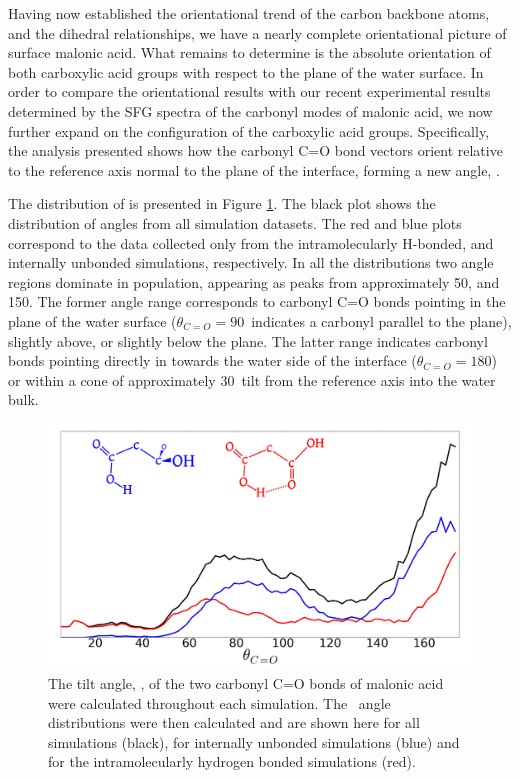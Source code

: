 Having now established the \thetaphi orientational trend of the carbon backbone atoms, and the \psipsi dihedral relationships, we have a nearly complete orientational picture of surface malonic acid. What remains to determine is the absolute orientation of both carboxylic acid groups with respect to the plane of the water surface. In order to compare the orientational results with our recent experimental results determined by the SFG spectra of the carbonyl modes of malonic acid,\cite{Blower2012} we now further expand on the configuration of the carboxylic acid groups. Specifically, the analysis presented shows how the carbonyl C=O bond vectors orient relative to the reference axis normal to the plane of the interface, forming a new angle, \thetacarb.

The distribution of \thetacarb is presented in Figure \ref{fig:theta-carb}. The black plot shows the distribution of angles from all simulation datasets. The red and blue plots correspond to the \thetacarb data collected only from the intramolecularly H-bonded, and internally unbonded simulations, respectively. In all the distributions two angle regions dominate in population, appearing as peaks from approximately 50\degr, and 150\degr. The former angle range corresponds to carbonyl C=O bonds pointing in the plane of the water surface ($\theta_{C=O}=90$\degr~indicates a carbonyl parallel to the plane), slightly above, or slightly below the plane. The latter range indicates carbonyl bonds pointing directly in towards the water side of the interface ($\theta_{C=O}=180$\degr) or within a cone of approximately 30\degr~tilt from the reference axis into the water bulk.


\begin{figure}[h!]
	\begin{center}
		\includegraphics[scale=1.0]{images/orientation/ThetaCarbonyl.png}
		\caption{The tilt angle, \thetacarb, of the two carbonyl C=O bonds of malonic acid were calculated throughout each simulation. The \thetacarb~angle distributions were then calculated and are shown here for all simulations (black), for internally unbonded simulations (blue) and for the intramolecularly hydrogen bonded simulations (red).}
		\label{fig:theta-carb}
	\end{center}
\end{figure}

